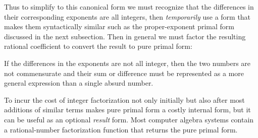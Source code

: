 \documentclass[12pt,english]{article}
\theoremstyle{definition}
\theoremstyle{remark}
\theoremstyle{plain}
\theoremstyle{plain}
\begin{document}
Thus to simplify  to this canonical
form we must recognize that the differences in their corresponding
exponents are all integers, then \textsl{temporarily} use a form that
makes them syntactically similar such as the proper-exponent primal
form discussed in the next subsection. Then in general we must factor
the resulting rational coefficient to convert the result to pure primal
form:

If the differences in the exponents are not all integer, then the
two numbers are not commensurate and their sum or difference must
be represented as a more general expression than a single absurd number.

To incur the cost of integer factorization not only initially but
also after most additions of similar terms makes pure primal form
a costly internal form, but it can be useful as an optional \textsl{result}
form. Most computer algebra systems contain a rational-number factorization
function that returns the pure primal form.
\end{document}
